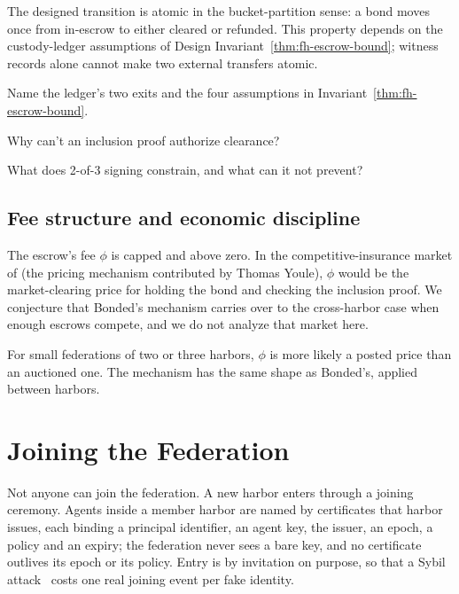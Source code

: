 \documentclass[11pt,a4paper]{article}
\theoremstyle{definition}
\theoremstyle{remark}
\begin{document}
The designed transition is atomic in the bucket-partition sense: a bond moves once from in-escrow to either cleared or refunded. This property depends on the custody-ledger assumptions of Design Invariant~\ref{thm:fh-escrow-bound}; witness records alone cannot make two external transfers atomic.

\pdexercisepointerone*{\ref{ex:fh-three-party-settlement}}{\pageref{ex:fh-three-party-settlement}}

\begin{pdrecitation}
\item Name the ledger's two exits and the four assumptions in Invariant~\ref{thm:fh-escrow-bound}.
\item Why can't an inclusion proof authorize clearance?
\item What does 2-of-3 signing constrain, and what can it not prevent?
\end{pdrecitation}

\subsection{Fee structure and economic discipline}\label{sec:fh-econ}

The escrow's fee $\phi$ is capped and above zero. In the competitive-insurance market of  (the pricing mechanism contributed by Thomas Youle), $\phi$ would be the market-clearing price for holding the bond and checking the inclusion proof. We conjecture that Bonded's mechanism carries over to the cross-harbor case when enough escrows compete, and we do not analyze that market here.

For small federations of two or three harbors, $\phi$ is more likely a posted price than an auctioned one. The mechanism has the same shape as Bonded's, applied between harbors.

\section{Joining the Federation}\label{sec:fh-admission}
\ifpdmargincolumn\pdlifetimeintersection\fi

Not anyone can join the federation. A new harbor enters through a joining ceremony. Agents inside a member harbor are named by certificates that harbor issues, each binding a principal identifier, an agent key, the issuer, an epoch, a policy and an expiry; the federation never sees a bare key, and no certificate outlives its epoch or its policy. Entry is by invitation on purpose, so that a Sybil attack~ costs one real joining event per fake identity.
\end{document}
